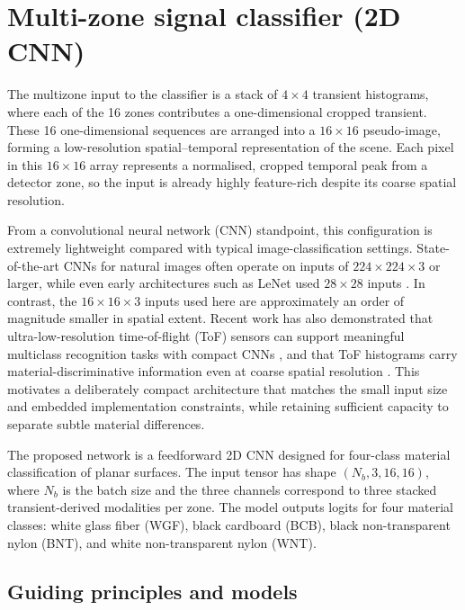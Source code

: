 \documentclass[12pt,a4paper,oneside]{report}
\let\oldsection\section
\renewcommand{\section}{\clearpage\oldsection}
\begin{document}
\newpage
\section{Multi-zone signal classifier (2D CNN)}
\label{sec:multizone_signal_classifier}

The multizone input to the classifier is a stack of $4 \times 4$ transient histograms, where each of the 16 zones contributes a one-dimensional cropped transient. These 16 one-dimensional sequences are arranged into a $16 \times 16$ pseudo-image, forming a low-resolution spatial--temporal representation of the scene. Each pixel in this $16 \times 16$ array represents a normalised, cropped temporal peak from a detector zone, so the input is already highly feature-rich despite its coarse spatial resolution.

From a convolutional neural network (CNN) standpoint, this configuration is extremely lightweight compared with typical image-classification settings. State-of-the-art CNNs for natural images often operate on inputs of $224 \times 224 \times 3$ or larger, while even early architectures such as LeNet used $28 \times 28$ inputs \cite{lecun1998}. In contrast, the $16 \times 16 \times 3$ inputs used here are approximately an order of magnitude smaller in spatial extent. Recent work has also demonstrated that ultra-low-resolution time-of-flight (ToF) sensors can support meaningful multiclass recognition tasks with compact CNNs \cite{fasolino2024}, and that ToF histograms carry material-discriminative information even at coarse spatial resolution \cite{su2016,becker2023}. This motivates a deliberately compact architecture that matches the small input size and embedded implementation constraints, while retaining sufficient capacity to separate subtle material differences.

The proposed network is a feedforward 2D CNN designed for four-class material classification of planar surfaces. The input tensor has shape $(N_b,3,16,16)$, where $N_b$ is the batch size and the three channels correspond to three stacked transient-derived modalities per zone. The model outputs logits for four material classes: white glass fiber (WGF), black cardboard (BCB), black non-transparent nylon (BNT), and white non-transparent nylon (WNT).

\subsection{Guiding principles and models}
\label{subsec:guiding_principles_models}
\end{document}
